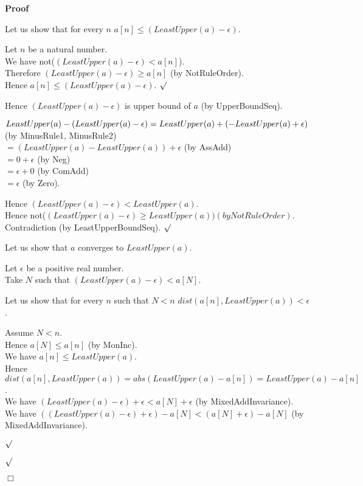 \documentclass{article}
\newenvironment{forthel}{\begin{leftbar}}{\end{leftbar}}
\newenvironment{proof}{\noindent\textbf{Proof\ }}{\hspace*{\fill}$\Box$\medskip}
\newenvironment{subproof}{\begin{list}{}{}
		\item[\text{Proof}]}{\hfill $\surd$ \end{list}}
\newcommand{\dotequal}{=}
\begin{document}
\begin{forthel}
\begin{proof}
\begin{subproof}
			Let us show that for every $n$ $a[n] \leq (LeastUpper(a) - \epsilon)$.
			\begin{subproof}
				Let $n$ be a natural number.\\
				We have not($(LeastUpper(a) - \epsilon) < a[n]$).\\
				Therefore $(LeastUpper(a) - \epsilon) \geq a[n]$ (by NotRuleOrder).\\
				Hence $a[n] \leq (LeastUpper(a) - \epsilon)$.
			\end{subproof}
			Hence $(LeastUpper(a) - \epsilon)$ is upper bound of $a$ (by UpperBoundSeq).
			
			$LeastUpper(a) - (LeastUpper(a) - \epsilon)\\ \dotequal LeastUpper(a) + (-LeastUpper(a) + \epsilon)$ (by MinusRule1, MinusRule2)\\
			$\dotequal (LeastUpper(a) - LeastUpper(a)) + \epsilon$ (by AssAdd)\\
			$\dotequal 0 + \epsilon$ (by Neg)\\
			$\dotequal \epsilon + 0$ (by ComAdd)\\
			$\dotequal \epsilon$ (by Zero).

			Hence $(LeastUpper(a) - \epsilon) < LeastUpper(a)$.\\
			Hence not($(LeastUpper(a) - \epsilon) \geq LeastUpper(a)) (by NotRuleOrder)$.\\
			Contradiction (by LeastUpperBoundSeq).
		\end{subproof}
		
		\noindent Let us show that $a$ converges to $LeastUpper(a)$.
		
		\begin{subproof}
			Let $\epsilon$ be a positive real number.\\
			Take $N$ such that $(LeastUpper(a) - \epsilon) < a[N]$.
			
			Let us show that for every $n$ such that $N < n$ $dist(a[n],LeastUpper(a)) < \epsilon$.
			\begin{subproof}
				Assume $N < n$.\\
				Hence $a[N] \leq a[n]$ (by MonInc).\\
				We have $a[n] \leq LeastUpper(a)$.\\
				Hence $dist(a[n],LeastUpper(a)) = abs(LeastUpper(a) - a[n]) = LeastUpper(a) - a[n]$.\\
				We have $(LeastUpper(a) - \epsilon) + \epsilon < a[N] + \epsilon$ (by MixedAddInvariance).\\
				We have $((LeastUpper(a) - \epsilon) + \epsilon) - a[N] < (a[N] + \epsilon) - a[N]$ (by MixedAddInvariance).
				

\end{subproof}
\end{subproof}
\end{proof}
\end{forthel}
\end{document}
